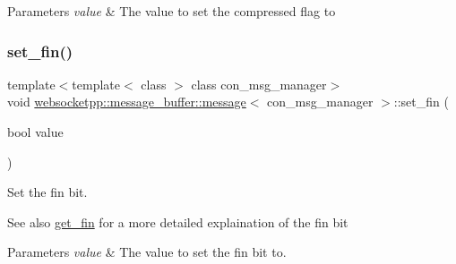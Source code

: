 \begin{DoxyParams}{Parameters}
{\em value} & The value to set the compressed flag to \\
\hline
\end{DoxyParams}
\mbox{\label{classwebsocketpp_1_1message__buffer_1_1message_ae726efab2bc95acf7a1fcd327a8e85b9}} 
\subsubsection{\texorpdfstring{set\+\_\+fin()}{set\_fin()}}
{\footnotesize\ttfamily template$<$template$<$ class $>$ class con\+\_\+msg\+\_\+manager$>$ \\
void \mbox{\hyperlink{classwebsocketpp_1_1message__buffer_1_1message}{websocketpp\+::message\+\_\+buffer\+::message}}$<$ con\+\_\+msg\+\_\+manager $>$\+::set\+\_\+fin (\begin{DoxyParamCaption}\item[{bool}]{value }\end{DoxyParamCaption})\hspace{0.3cm}{\ttfamily [inline]}}



Set the fin bit. 

\begin{DoxySeeAlso}{See also}
\mbox{\hyperlink{classwebsocketpp_1_1message__buffer_1_1message_a8546e56c8a4c6d7f9f37510183874fba}{get\+\_\+fin}} for a more detailed explaination of the fin bit
\end{DoxySeeAlso}

\begin{DoxyParams}{Parameters}
{\em value} & The value to set the fin bit to. \\
\hline
\end{DoxyParams}
\mbox{\label{classwebsocketpp_1_1message__buffer_1_1message_a230b36c0cd2572cfce1f218a15bc534e}} 
